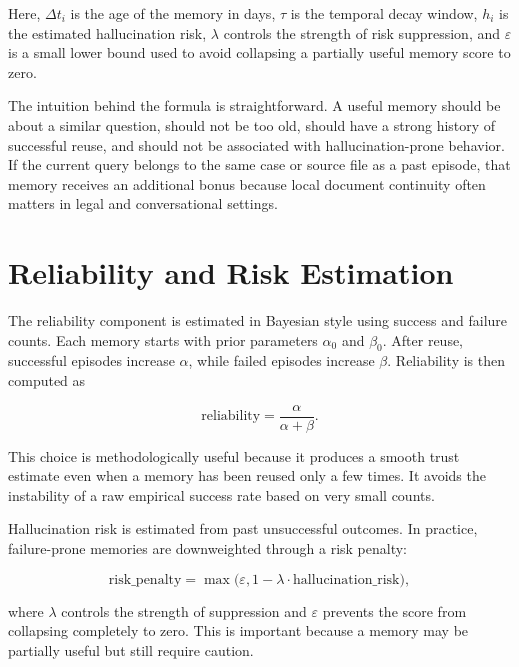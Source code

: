 Here, $\Delta t_i$ is the age of the memory in days, $\tau$ is the temporal decay window, $h_i$ is the estimated hallucination risk, $\lambda$ controls the strength of risk suppression, and $\varepsilon$ is a small lower bound used to avoid collapsing a partially useful memory score to zero.

The intuition behind the formula is straightforward. A useful memory should be about a similar question, should not be too old, should have a strong history of successful reuse, and should not be associated with hallucination-prone behavior. If the current query belongs to the same case or source file as a past episode, that memory receives an additional bonus because local document continuity often matters in legal and conversational settings.

\section{Reliability and Risk Estimation}
\label{sec:methodology-reliability}

The reliability component is estimated in Bayesian style using success and failure counts. Each memory starts with prior parameters $\alpha_0$ and $\beta_0$. After reuse, successful episodes increase $\alpha$, while failed episodes increase $\beta$. Reliability is then computed as

\begin{equation}
\label{eq:reliability}
\mathrm{reliability} = \frac{\alpha}{\alpha + \beta}.
\end{equation}

This choice is methodologically useful because it produces a smooth trust estimate even when a memory has been reused only a few times. It avoids the instability of a raw empirical success rate based on very small counts.

Hallucination risk is estimated from past unsuccessful outcomes. In practice, failure-prone memories are downweighted through a risk penalty:

\begin{equation}
\label{eq:risk-penalty}
\mathrm{risk\_penalty} = \max\bigl(\varepsilon, 1 - \lambda \cdot \mathrm{hallucination\_risk}\bigr),
\end{equation}

where $\lambda$ controls the strength of suppression and $\varepsilon$ prevents the score from collapsing completely to zero. This is important because a memory may be partially useful but still require caution.

